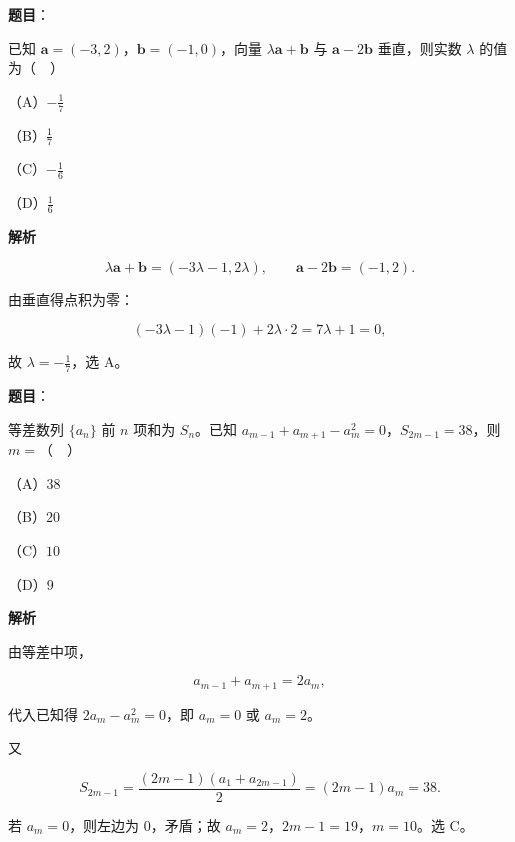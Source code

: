 \begin{answer}

\textbf{题目}：

已知 $\boldsymbol a=(-3,2)$，$\boldsymbol b=(-1,0)$，向量 $\lambda\boldsymbol a+\boldsymbol b$ 与 $\boldsymbol a-2\boldsymbol b$ 垂直，则实数 $\lambda$ 的值为（　）

（A）$-\frac17$

（B）$\frac17$

（C）$-\frac16$

（D）$\frac16$

\textbf{解析}

\nopagebreak[4]
\[\lambda\boldsymbol a+\boldsymbol b=(-3\lambda-1,2\lambda),\qquad \boldsymbol a-2\boldsymbol b=(-1,2).\]

由垂直得点积为零：

\nopagebreak[4]
\[(-3\lambda-1)(-1)+2\lambda\cdot2=7\lambda+1=0,\]

故 $\lambda=-\frac17$，选 A。


\end{answer}
\begin{answer}

\textbf{题目}：

等差数列 $\{a_n\}$ 前 $n$ 项和为 $S_n$。已知 $a_{m-1}+a_{m+1}-a_m^2=0$，$S_{2m-1}=38$，则 $m=$（　）

（A）$38$

（B）$20$

（C）$10$

（D）$9$

\textbf{解析}

由等差中项，

\nopagebreak[4]
\[a_{m-1}+a_{m+1}=2a_m,\]

代入已知得 $2a_m-a_m^2=0$，即 $a_m=0$ 或 $a_m=2$。

又

\nopagebreak[4]
\[S_{2m-1}=\frac{(2m-1)(a_1+a_{2m-1})}{2}=(2m-1)a_m=38 .\]

若 $a_m=0$，则左边为 $0$，矛盾；故 $a_m=2$，$2m-1=19$，$m=10$。选 C。


\end{answer}
